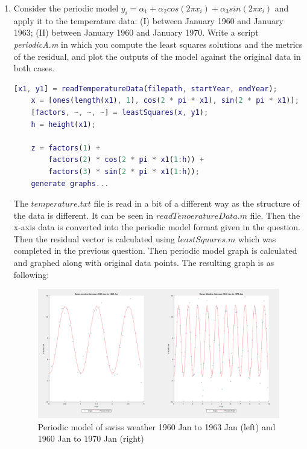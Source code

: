\documentclass[unicode,11pt,a4paper,oneside,numbers=endperiod,openany]{scrartcl}
\begin{document}
\begin{enumerate}[label=(\alph*)]
 \item Consider the periodic model ${y_i = \alpha_1 + \alpha_2 cos(2\pi x_i ) + \alpha_3 sin(2\pi x_i )}$ and apply it to the temperature data:
(I) between January 1960 and January 1963; (II) between January 1960 and January 1970. Write a script
\textit{periodicA.m} in which you compute the least squares solutions and the metrics of the residual, and plot the
outputs of the model against the original data in both cases. \\

\begin{lstlisting}[language=Matlab]
    [x1, y1] = readTemperatureData(filepath, startYear, endYear);
    x = [ones(length(x1), 1), cos(2 * pi * x1), sin(2 * pi * x1)];
    [factors, ~, ~, ~] = leastSquares(x, y1);
    h = height(x1);

    z = factors(1) + 
        factors(2) * cos(2 * pi * x1(1:h)) + 
        factors(3) * sin(2 * pi * x1(1:h));
    generate graphs...
\end{lstlisting}

The ${temperature.txt}$ file is read in a bit of a different way as the structure of the data is different. It can be seen in ${readTenoeratureData.m}$ file. Then the x-axis data is converted into the periodic model format given in the question. Then the residual vector is calculated using ${leastSquares.m}$ which was completed in the previous question. Then periodic model graph is calculated and graphed along with original data points. The resulting graph is as following: \\

 \begin{figure}[h!]
    \begin{minipage}[c]{1\linewidth}
        \centering
        \includegraphics[width=0.9\linewidth]{./figures/ex3a.png}
    \end{minipage}
  \caption{Periodic model of swiss weather 1960 Jan to 1963 Jan (left) and 1960 Jan to 1970 Jan (right)}
\end{figure}


\end{enumerate}
\end{document}
